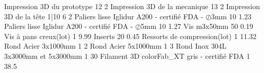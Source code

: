 %
%
%
%
%
%
%
 {Impression 3D du prototype} {12} {2}
 {Impression 3D de la mecanique} {13} {2}
 {Impression 3D de la tête 1|10 } {6} {2}
 {Paliers lisse Iglidur A200 - certifié FDA - $\oslash$3mm} {10} {1.23}
 {Paliers lisse Iglidur A200 - certifié FDA - $\oslash$5mm} {10} {1.27}
 {Vis m3x50mm } {50} {0.19}
 {Vis à pans creux(lot)} {1} {9.99}
 {Inserts} {20} {0.45}
 {Ressorts de compression(lot)} {1} {11.32}
 {Rond Acier 3x1000mm} {1} {2}
 {Rond Acier 5x1000mm } {1} {3}
 {Rond Inox 304L 3x3000mm et 5x3000mm} {1} {30}
 {Filament 3D colorFab\_XT gris - certifié FDA} {1} {38.5}
%
%
%
%
%
%

